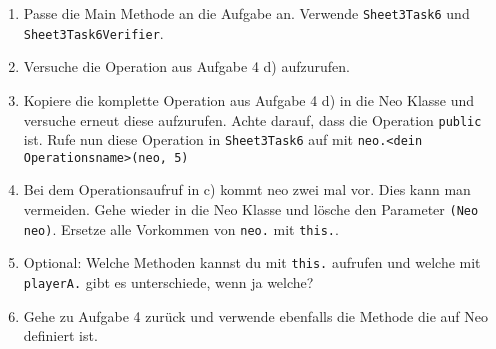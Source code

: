 

\begin{enumerate}
	\item 
		Passe die Main Methode an die Aufgabe an. Verwende \lstinline{Sheet3Task6} und \lstinline{Sheet3Task6Verifier}.
		
	\item 
		Versuche die Operation aus Aufgabe 4 d) aufzurufen.
		
	\item 
		Kopiere die komplette Operation aus Aufgabe 4 d) in die Neo Klasse und versuche erneut diese aufzurufen. 
		Achte darauf, dass die Operation \lstinline{public} ist.
		Rufe nun diese Operation in \lstinline{Sheet3Task6} auf mit \lstinline{neo.<dein Operationsname>(neo, 5)}
	
	\item
		Bei dem Operationsaufruf in c) kommt neo zwei mal vor. 
		Dies kann man vermeiden. 
		Gehe wieder in die Neo Klasse und lösche den Parameter \lstinline{(Neo neo)}. 
		Ersetze alle Vorkommen von \lstinline{neo.} mit \lstinline{this.}.

	\item Optional: 
		Welche Methoden kannst du mit \lstinline{this.} aufrufen und welche mit \lstinline{playerA.} gibt es unterschiede, wenn ja welche?

	\item 
		Gehe zu Aufgabe 4 zurück und verwende ebenfalls die Methode die auf Neo definiert ist.
\end{enumerate}
